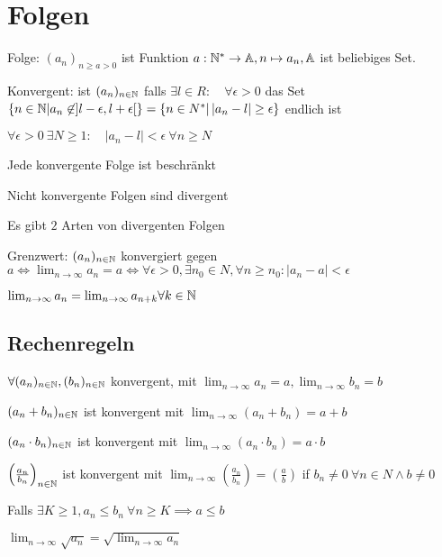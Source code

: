 
\section{Folgen}

\begin{compactdesc}
    \item[Folge:] $\left( a_n \right)_{n \ge a  > 0}$ ist Funktion $a:\mathbb{N}^* \to \mathbb{A}, n \mapsto a_n, \mathbb{A}$ ist beliebiges Set.
    \item[Konvergent:] ist $(a_n)_{n \in \mathbb{N}}$ falls $\exists l \in R: \quad \forall \epsilon > 0$ das Set $\left\{ n \in \mathbb{N} | a_n \not\in  ] l - \epsilon, l + \epsilon[ \right\} = \left\{ n \in N^* | \left| a_n - l \right| \ge \epsilon  \right\} $ endlich ist
        \begin{compactitem}
            \item $\forall  \epsilon > 0 \ \exists  N \ge 1: \quad |a_n - l| < \epsilon \ \forall n \ge N$
            \item Jede konvergente Folge ist beschränkt
            \item Nicht konvergente Folgen sind divergent
            \item Es gibt $2$ Arten von divergenten Folgen
        \end{compactitem}
    \item[Grenzwert:] $(a_n)_{n \in \mathbb{N}}$ konvergiert gegen $a \iff \lim_{n \to \infty} a_n = a \iff \forall \epsilon > 0, \exists n_0 \in N, \forall n \ge n_0: \left| a_n - a \right| < \epsilon$
        \begin{compactitem}
            \item $\lim_{n \to \infty} a_n = \lim_{n \to \infty} a_{n+k} \forall k \in \mathbb{N} $
        \end{compactitem}
\end{compactdesc}

\subsection{Rechenregeln}
$\forall (a_n)_{n \in \mathbb{N}}, (b_n)_{n \in \mathbb{N}}$ konvergent, mit $\lim_{n \to \infty} a_n = a, \lim_{n \to \infty} b_n = b$
\begin{compactenum}
    \item $(a_n + b_n)_{n \in \mathbb{N}}$ ist konvergent mit $\lim_{n \to \infty} (a_n + b_n) = a + b$
    \item $(a_n \cdot  b_n)_{n \in \mathbb{N}}$ ist konvergent mit $\lim_{n \to \infty} (a_n \cdot  b_n) = a \cdot b$
    \item $\left( \frac{a_n}{b_n} \right) _{n \in \mathbb{N}}$ ist konvergent mit $\lim_{n \to \infty} \left( \frac{a_n}{b_n} \right) = \left( \frac{a}{b} \right)$ if $b_n \neq 0 \ \forall n \in N \wedge  b \neq 0$
    \item Falls $\exists K \ge 1, a_n \le  b_n \ \forall n \ge K \implies a \le b$
    \item $\lim_{n \to \infty} \sqrt{a_n} = \sqrt{\lim_{n \to \infty} a_n}$
\end{compactenum}


